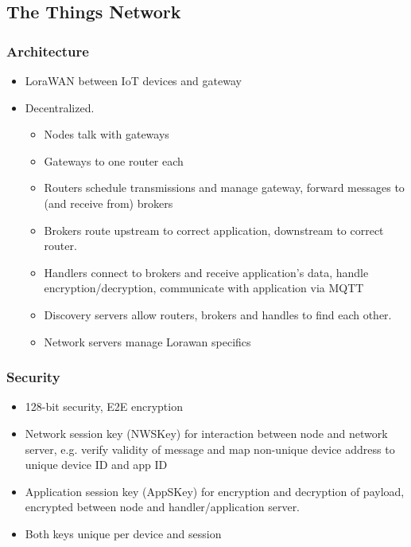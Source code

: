 \subsection{The Things Network}

\subsubsection{Architecture}

\begin{itemize}
		\item LoraWAN between IoT devices and gateway
		\item Decentralized.
				\begin{itemize}
						\item Nodes talk with gateways
						\item Gateways to one router each
						\item Routers schedule transmissions and manage
								gateway, forward messages to (and receive from)
								brokers
						\item Brokers route upstream to correct application,
								downstream to correct router.
						\item Handlers connect to brokers and receive
								application's data, handle
								encryption/decryption, communicate with
								application via MQTT
						\item Discovery servers allow routers, brokers and
								handles to find each other.
						\item Network servers manage Lorawan specifics
				\end{itemize}
\end{itemize}

\subsubsection{Security}

\begin{itemize}
		\item 128-bit security, E2E encryption
		\item Network session key (NWSKey) for interaction between node and
				network server, e.g. verify validity of message and map
				non-unique device address to unique device ID and app ID
		\item Application session key (AppSKey) for encryption and decryption
				of payload, encrypted between node and handler/application
				server.
		\item Both keys unique per device and session
\end{itemize}

